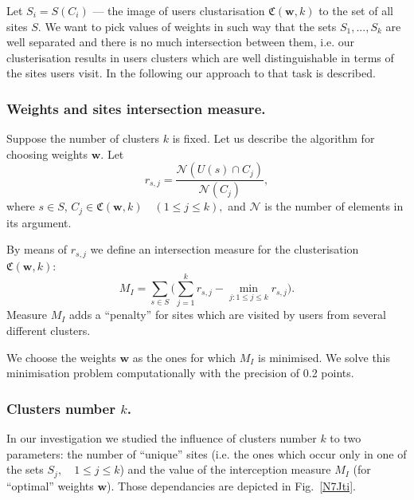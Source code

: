 \documentclass[runningheads,a4paper]{llncs}
\begin{document}
Let $S_i = S(C_i)$ --- the image of users clustarisation $\mathfrak{C}(\boldsymbol{w}, k)$ to the set of all sites $S$. We want to pick values of weights in such way that the sets $S_1, ..., S_k$ are well separated and there is no much intersection between them, i.e. our clusterisation results in users clusters which are well distinguishable in terms of the sites users visit. In the following our approach to that task is described.



\subsubsection{Weights and sites intersection measure.}

Suppose the number of clusters $k$ is fixed. Let us describe the algorithm for choosing weights $\boldsymbol{w}$. Let
\[
	r_{s,j} = \frac{\mathcal{N}(U(s) \cap C_j)}{\mathcal{N}(C_j)},
\]
where $s \in S$, $C_j \in \mathfrak{C}(\boldsymbol{w}, k) \quad (1 \leq j \leq k ),$ and $\mathcal{N}$ is the number of elements in its argument.

By means of $r_{s,j}$ we define an intersection measure for the clusterisation $\mathfrak{C}(\boldsymbol{w}, k)$:
\[
	M_I = \sum_{s \in S} \Big( \sum_{j=1}^{k} r_{s,j} - \min_{j\colon 1 \leq j \leq k} r_{s,j} \Big).
\]
Measure $M_I$ adds a ``penalty'' for sites which are visited by users from several different clusters.

We choose the weights $\boldsymbol{w}$ as the ones for which $M_I$ is minimised. We solve this minimisation problem computationally with the precision of 0.2 points.



\subsubsection{Clusters number $k$.}

In our investigation we studied the influence of clusters number $k$ to two parameters: the number of ``unique'' sites (i.e. the ones which occur only in one of the sets $S_j, \quad 1 \leq j \leq k$) and the value of the interception measure $M_I$ (for ``optimal'' weights $\boldsymbol{w}$). Those dependancies are depicted in Fig.~\ref{N7Jti}.
\end{document}
